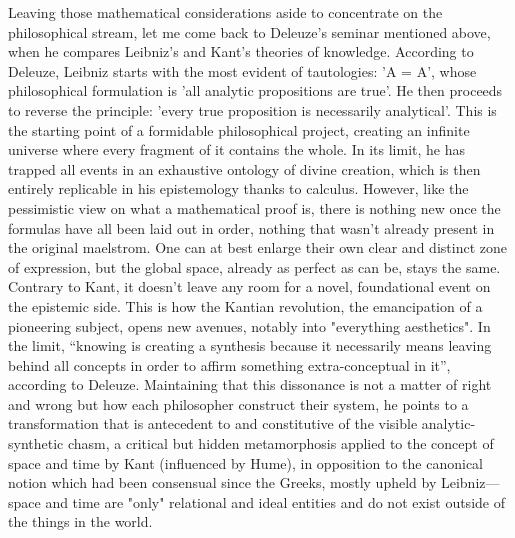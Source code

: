 \documentclass[11pt]{article}
\begin{document}
Leaving those mathematical considerations aside to concentrate on the philosophical
stream, let me come back to Deleuze's seminar mentioned above, when he compares
Leibniz's and Kant's theories of knowledge. According to Deleuze, Leibniz starts with
the most evident of tautologies: 'A = A', whose philosophical formulation is 'all
analytic propositions are true'. He then proceeds to reverse the principle: 'every true
proposition is necessarily analytical'. This is the starting point of a formidable
philosophical project, creating an infinite universe where every fragment of it contains
the whole. In its limit, he has trapped all events in an exhaustive ontology of divine
creation, which is then entirely replicable in his epistemology thanks to calculus.
However, like the pessimistic view on what a mathematical proof is, there is nothing new
once the formulas have all been laid out in order, nothing that wasn't already present
in the original maelstrom. One can at best enlarge their own clear and distinct zone of
expression, but the global space, already as perfect as can be, stays the same. Contrary
to Kant, it doesn't leave any room for a novel, foundational event on the epistemic
side. This is how the Kantian revolution, the emancipation of a pioneering subject,
opens new avenues, notably into "everything aesthetics". In the limit, ``knowing is
creating a synthesis because it necessarily means leaving behind all concepts in order
to affirm something extra-conceptual in it'', according to Deleuze. Maintaining that
this dissonance is not a matter of right and wrong but how each philosopher construct
their system, he points to a transformation that is antecedent to and constitutive of
the visible analytic-synthetic chasm, a critical but hidden metamorphosis applied to the
concept of space and time by Kant (influenced by Hume), in opposition to the canonical
notion which had been consensual since the Greeks, mostly upheld by Leibniz---space and
time are "only" relational and ideal entities and do not exist outside of the things in
the world.
\end{document}
